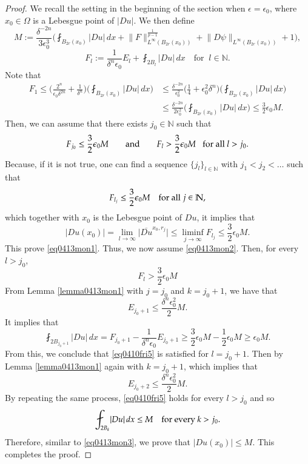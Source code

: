 \documentclass[reqno]{amsart}
\numberwithin{equation}{section}
\theoremstyle{plain}
\theoremstyle{definition}
\theoremstyle{remark}
\providecommand{\set}[1]{\{#1\}}
\providecommand{\abs}[1]{\lvert#1\rvert}
\providecommand{\norm}[1]{\lVert#1\rVert}
\begin{document}
\begin{proof}
We recall the setting in the beginning of the section when $\epsilon=\epsilon_0$, where $x_0\in \Omega$  is a Lebesgue point of $\abs{Du}$. 
We then define 
\[
M:=\frac{\delta^{-2n}}{3\epsilon_0^3}\bigg(\fint_{B_{2r}(x_0)} \abs{Du} \,dx  +   \norm{F}_{L^\infty(B_{2r}(x_0))}
^{\frac{1}{p-1}}+\norm{D\psi}_{L^\infty(B_{2r}(x_0))}+1   \bigg),
\]
\begin{equation*}%
F_l:=\frac{1}{\delta^n \epsilon_0} E_l+\fint_{2B_l} \abs{Du} \,dx
\quad \text{for }\ l\in \mathbb{N}. 
\end{equation*} 
Note that
\begin{align*}
F_1\leq\bigg(  \frac{2^n}{\epsilon_0\delta^{2n}}+\frac{1}{\delta^{n}} \bigg)\bigg(\fint_{B_{2r}(x_0)} \abs{Du}\, dx \bigg)
&\leq\frac{\delta^{-2n}}{\epsilon_0^2}\bigg(  \frac{1}{ 4}+\epsilon_0^2 \delta^n \bigg)\bigg(\fint_{B_{2r}(x_0)} \abs{Du} \,dx \bigg)\\
&\leq\frac{\delta^{-2n}}{2\epsilon_0^2} \bigg(\fint_{B_{2r}(x_0)} \abs{Du} \,dx \bigg)\leq \frac{3}{2}\epsilon_0 M.
\end{align*}
Then, we can assume that there exists $j_0\in \mathbb{N}$ such that
\begin{equation}\label{eq0413mon2}
F_{j_0}\leq \frac{3}{2}\epsilon_0 M\qquad\hbox{and}\qquad F_{l}>\frac{3}{2}\epsilon_0 M\;~\;\hbox{for all $l>j_0$}.
\end{equation}
Because, if it is not true, one can find a sequence $\set{j_l}_{l\in\mathbb{N}}$ with $j_1<j_2<\ldots$ such that
\[
F_{l_j}\leq \frac{3}{2}\epsilon_0 M\quad\hbox{for all $j\in \mathbb{N}$},
\]
which together with $x_0$ is the Lebesgue point of $Du$, it implies that
\begin{equation}\label{eq0413mon3}
\abs{Du(x_0)}=\lim_{l\rightarrow \infty} \abs{\overline{Du}^{x_0,r_j}}\leq \liminf_{j\rightarrow \infty} F_{l_j}\leq \frac{3}{2}\epsilon_0 M.
\end{equation}
This prove \eqref{eq0413mon1}. Thus, we now assume \eqref{eq0413mon2}. Then, for every $l> j_0$,
\[
F_l >\frac{3}{2}\epsilon_0 M %
\]
From Lemma \ref{lemma0413mon1} with $j=j_0$ and $k=j_0+1$, 
we have that
\[
E_{j_0+1} \leq \frac{\delta^n\epsilon_0^2}{2}M.
\]
It implies that
\[
\fint_{2B_{j_0+1}}\abs{Du}\, dx= F_{j_0+1} -\frac{1}{\delta^n \epsilon_0} E_{j_0+1}\geq  \frac{3}{2}\epsilon_0 M -\frac{1}{2}\epsilon_0 M\geq \epsilon_0 M.
\]
From this, we conclude that \eqref{eq0410fri5} is satisfied for $l=j_0+1$. Then by Lemma \ref{lemma0413mon1} again with $k=j_0+1$, which implies that
\[
E_{j_0+2} \leq \frac{\delta^n\epsilon_0^2}{2}M.
\]
By repeating the same process, \eqref{eq0410fri5} holds for every $l>j_0$ and so
\[
\fint_{2B_k}\abs{Du} \,dx\leq M\quad\hbox{for every $k> j_0$}.
\]
Therefore, similar to \eqref{eq0413mon3}, we prove that $\abs{Du(x_0)}\leq M$. This completes the proof.
\end{proof}
\end{document}
